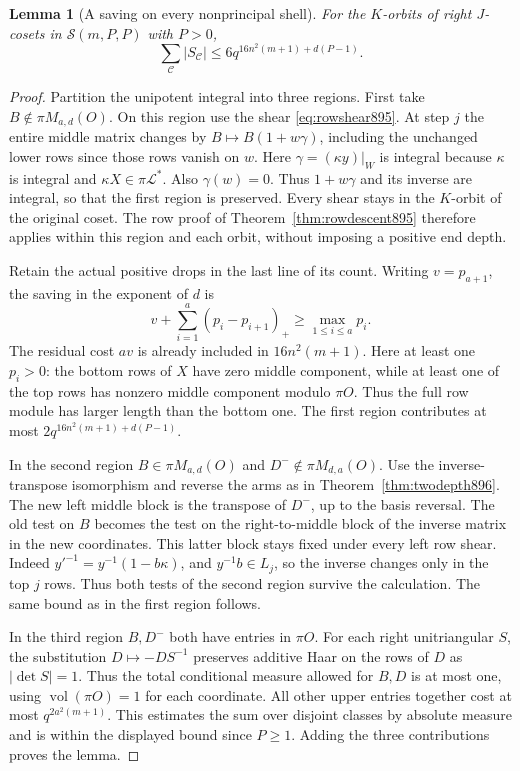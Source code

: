 \documentclass[a4paper,11pt]{article}
\newtheorem{lemma}[proposition]{Lemma}
\theoremstyle{definition}
\theoremstyle{remark}
\numberwithin{equation}{section}
\begin{document}
\begin{lemma}[A saving on every nonprincipal shell]
\leavevmode\label{lem:onesave897}
For the \(K\)-orbits of right \(J\)-cosets in
\(\mathcal S(m,P,P)\) with \(P>0\),
\[
       \sum_{\mathcal C}|S_{\mathcal C}|
          \le 6q^{16n^2(m+1)+d(P-1)} .
\]
\end{lemma}
\begin{proof}
Partition the unipotent integral into three regions. First take
\(B\notin\pi M_{a,d}(O)\). On this region use the shear
\eqref{eq:rowshear895}. At step \(j\) the entire middle matrix
changes by \(B\mapsto B(1+w\gamma)\), including the unchanged
lower rows since those rows vanish on \(w\). Here
\(\gamma=(\kappa y)|_W\) is integral because \(\kappa\) is integral
and \(\kappa X\in\pi\mathcal L^*\). Also \(\gamma(w)=0\).
Thus \(1+w\gamma\) and its inverse are integral, so that
the first region is preserved. Every shear stays in the
\(K\)-orbit of the original coset. The row proof of
Theorem~\ref{thm:rowdescent895} therefore applies within this
region and each orbit, without imposing a positive end depth.

Retain the actual positive drops in the last line of its count.
Writing \(v=p_{a+1}\), the saving in the exponent of \(d\) is
\[
                  v+\sum_{i=1}^a(p_i-p_{i+1})_+
                         \ge \max_{1\le i\le a}p_i.
\]
The residual cost \(av\) is already included in \(16n^2(m+1)\).
Here at least one \(p_i>0\): the bottom rows of \(X\) have zero
middle component, while at least one of the top rows has
nonzero middle component modulo \(\pi O\). Thus the full row
module has larger length than the bottom one. The first region
contributes at most \(2q^{16n^2(m+1)+d(P-1)}\).

In the second region \(B\in\pi M_{a,d}(O)\) and
\(D^-\notin\pi M_{d,a}(O)\). Use the inverse-transpose isomorphism
and reverse the arms as in Theorem~\ref{thm:twodepth896}. The
new left middle block is the transpose of \(D^-\), up to the
basis reversal. The old test on \(B\) becomes the test on the
right-to-middle block of the inverse matrix in the new
coordinates. This latter block stays fixed under every left row
shear. Indeed \(y'^{-1}=y^{-1}(1-b\kappa)\), and \(y^{-1}b\in L_j\),
so the inverse changes only in the top \(j\) rows. Thus both
tests of the second region survive the calculation. The same
bound as in the first region follows.

In the third region \(B,D^-\) both have entries in \(\pi O\).
For each right unitriangular \(S\), the substitution
\(D\mapsto-D S^{-1}\) preserves additive Haar on the rows of \(D\)
as \(\lvert\det S\rvert=1\). Thus the total conditional measure
allowed for \(B,D\) is at most one, using
\(\operatorname{vol}(\pi O)=1\) for each coordinate. All other
upper entries together cost at most \(q^{2a^2(m+1)}\).
This estimates the sum over disjoint classes by absolute measure
and is within the displayed bound since \(P\ge1\). Adding the
three contributions proves the lemma.
\end{proof}
\end{document}
